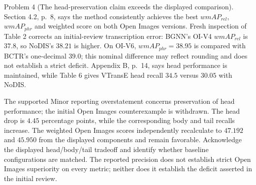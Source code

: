 \documentclass[10pt]{article}
\begin{document}
Problem 4 (The head-preservation claim exceeds the displayed comparison).  Section 4.2, p. 8, says the method consistently achieves the best \(wmAP_{rel}\), \(wmAP_{phr}\) and weighted score on both Open Images versions. Fresh inspection of Table 2 corrects an initial-review transcription error: BGNN’s OI-V4 \(wmAP_{rel}\) is \(37.8\), so NoDIS’s \(38.21\) is higher. On OI-V6, \(wmAP_{phr}=38.95\) is compared with BCTR’s one-decimal \(39.0\); this nominal difference may reflect rounding and does not establish a strict deficit. Appendix B, p. 14, says head performance is maintained, while Table 6 gives VTransE head recall \(34.5\) versus \(30.05\) with NoDIS.\par
The supported Minor reporting overstatement concerns preservation of head performance; the initial Open Images counterexample is withdrawn. The head drop is \(4.45\) percentage points, while the corresponding body and tail recalls increase. The weighted Open Images scores independently recalculate to \(47.192\) and \(45.950\) from the displayed components and remain favorable. Acknowledge the displayed head/body/tail tradeoff and identify whether baseline configurations are matched. The reported precision does not establish strict Open Images superiority on every metric; neither does it establish the deficit asserted in the initial review.\par
\end{document}
